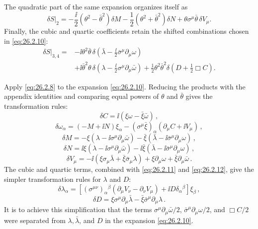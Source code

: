 The quadratic part of the same expansion organizes itself as
\[
  \delta S\big|_2
  =-\frac{\ii}{2}(\theta^2-\bar\theta^2)\delta M
   -\frac12(\theta^2+\bar\theta^2)\delta N
   +\theta\sigma^\mu\bar\theta\,\delta V_\mu .
\]
Finally, the cubic and quartic coefficients retain the shifted combinations
chosen in \eqref{eq:26.2.10}:
\[
  \begin{aligned}
  \delta S\big|_{3,4}={}&
  -\ii\theta^2\bar\theta\,
   \delta\left(\bar\lambda-\frac{\ii}{2}
     \bar\sigma^\mu\partial_\mu\omega\right)\\
  &+\ii\bar\theta^2\theta\,
   \delta\left(\lambda-\frac{\ii}{2}
     \sigma^\mu\partial_\mu\bar\omega\right)
  +\frac12\theta^2\bar\theta^2
   \delta\left(D+\frac12\Box C\right).
  \end{aligned}
\]

Apply \eqref{eq:26.2.8} to the expansion \eqref{eq:26.2.10}. Reducing the
products with the appendix identities and comparing equal powers of
\(\theta\) and \(\bar\theta\) gives the transformation rules:
\begin{equation}
  \delta C=\ii(\xi\omega-\bar\xi\bar\omega)\,,
  \tag{26.2.11}\label{eq:26.2.11}
\end{equation}
\begin{equation}
  \delta\omega_\alpha
  =(-M+\ii N)\xi_\alpha
   -(\sigma^\mu\bar\xi)_\alpha(\partial_\mu C+\ii V_\mu)\,,
  \tag{26.2.12}\label{eq:26.2.12}
\end{equation}
\begin{equation}
  \delta M=-\xi\left(\lambda-\ii\sigma^\mu\partial_\mu\bar\omega\right)
  -\bar\xi\left(\bar\lambda
    -\ii\bar\sigma^\mu\partial_\mu\omega\right)\,,
  \tag{26.2.13}\label{eq:26.2.13}
\end{equation}
\begin{equation}
  \delta N=\ii\xi\left(\lambda-\ii\sigma^\mu\partial_\mu\bar\omega\right)
  -\ii\bar\xi\left(\bar\lambda
    -\ii\bar\sigma^\mu\partial_\mu\omega\right)\,,
  \tag{26.2.14}\label{eq:26.2.14}
\end{equation}
\begin{equation}
  \delta V_\mu
  =-\ii\left(\xi\sigma_\mu\bar\lambda
    +\bar\xi\bar\sigma_\mu\lambda\right)
   +\xi\partial_\mu\omega+\bar\xi\partial_\mu\bar\omega\,.
  \tag{26.2.15}\label{eq:26.2.15}
\end{equation}
The cubic and quartic terms, combined with
\eqref{eq:26.2.11} and \eqref{eq:26.2.12}, give the simpler transformation
rules for \(\lambda\) and \(D\):
\begin{equation}
  \delta\lambda_\alpha
  =\left[(\sigma^{\mu\nu})_\alpha{}^\beta
    (\partial_\mu V_\nu-\partial_\nu V_\mu)
    +\ii D\delta_\alpha{}^\beta\right]\xi_\beta\,,
  \tag{26.2.16}\label{eq:26.2.16}
\end{equation}
\begin{equation}
  \delta D
  =\xi\sigma^\mu\partial_\mu\bar\lambda
   -\bar\xi\bar\sigma^\mu\partial_\mu\lambda\,.
  \tag{26.2.17}\label{eq:26.2.17}
\end{equation}
It is to achieve this simplification that the terms
\(\sigma^\mu\partial_\mu\bar\omega/2\),
\(\bar\sigma^\mu\partial_\mu\omega/2\), and \(\Box C/2\) were separated
from \(\lambda,\bar\lambda\), and \(D\) in the expansion
\eqref{eq:26.2.10}.

